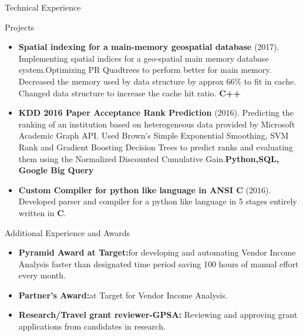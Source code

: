 \documentclass[]{nakulcv}
\begin{document}
    \begin{cvsection}{Technical Experience}
        \begin{cvsubsection}{Projects}{}{}
            \begin{itemize}
                \item \textbf{Spatial indexing for a main-memory geospatial database}
                    (2017). Implementing spatial indices for a geo-spatial main memory
                    database system.Optimizing PR Quadtrees to perform better for main
                    memory. Decreased the memory used by data structure by approx 66\% to
                    fit in cache. Changed data structure to increase the cache hit ratio. \textbf{C++}
                \item \textbf{KDD 2016 Paper Acceptance Rank Prediction} (2016). Predicting the ranking of an institution based on heterogeneous data provided by Microsoft Academic Graph API. Used Brown's Simple Exponential Smoothing, SVM Rank and Gradient Boosting Decision Trees to predict ranks and evaluating them using the Normalized Discounted Cumulative Gain.\textbf{Python,SQL, Google Big Query} 
                \item \textbf{Custom Compiler for python like language in ANSI C} (2016). Developed parser and compiler for a python like language in 5 stages entirely written in \textbf{C}.
            \end{itemize}
        \end{cvsubsection}
    \end{cvsection}

    \begin{cvsection}{Additional Experience and Awards}
        \begin{cvsubsection}{}{}{}	
            \begin{itemize}
                \item \textbf{Pyramid Award at Target:}for developing and automating Vendor Income Analysis faster than designated time period saving 100 hours of manual effort every month.
                \item \textbf{Partner's Award:}at Target for Vendor Income Analysis. 
                \item \textbf{Research/Travel grant reviewer-GPSA:} Reviewing and approving grant applications from candidates in research. 
            \end{itemize}
        \end{cvsubsection}
    \end{cvsection}
\end{document}
